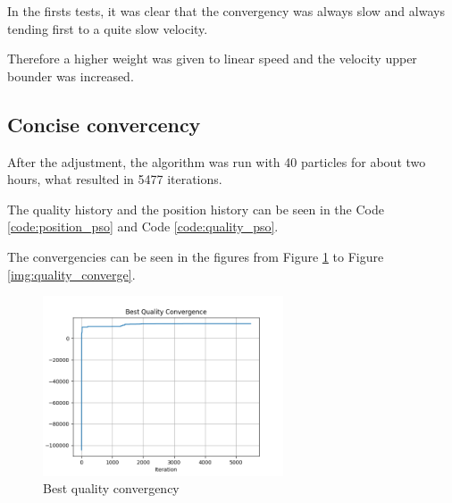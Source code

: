 

In the firsts tests, it was clear that the convergency was always slow and always tending first to a quite slow velocity.

Therefore a higher weight was given to linear speed and the velocity upper bounder was increased.

\subsection{Concise convercency}

After the adjustment, the algorithm was run with 40 particles for about two hours, what resulted in 5477 iterations.

The quality history and the position history can be seen in the Code \ref{code:position_pso} and Code \ref{code:quality_pso}.

The convergencies can be seen in the figures from Figure \ref{img:best_quality_converge} to Figure \ref{img:quality_converge}.





\begin{figure}
  \begin{center}
  \includegraphics[width=2.8in]{./../code/results/line_best_convergence.png}
  \caption{Best quality convergency}
  \label{img:best_quality_converge}
  \end{center}
\end{figure}

